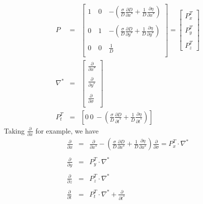 \documentclass[oribibl]{llncs}
\begin{document}
\begin{eqnarray}
P
&=&
\left[             
  \begin{array}{ccc}  
   1\ & 0\  & -\left( \frac{\sigma}{D} \frac{\partial D}{\partial x^*} + \frac{1}{D}\frac{\partial \eta}{\partial x^*} \right)\\   \nonumber \\ 
   0\  & 1\ & -\left(\frac{\sigma}{D} \frac{\partial D}{\partial y^*} + \frac{1}{D}\frac{\partial \eta}{\partial y^*} \right)\\   \nonumber \\ 
   0\ & 0\ & \frac{1}{D} \													      \\   
  \end{array}
\right]
=
\left[                 
  \begin{array}{c}  
    P^T_x  \\   \\ 
    P^T_y  \\  \\ 
    P^T_z  
  \end{array}
\right] 
\\
\nabla^*  &=&
\left[                 
  \begin{array}{c}  
    \frac{\partial}{\partial x^*}  \\  \\ 
    \frac{\partial}{\partial y^*}  \\ \\ 
    \frac{\partial}{\partial \sigma}  \\ 
  \end{array}
\right]\nonumber
\\
P^T_t &=&
\left[
0 \  0 \  -\left( \frac{\sigma}{D} \frac{\partial D}{\partial t^*} + \frac{1}{D}\frac{\partial \eta}{\partial t^*} \right)
\right] \nonumber 
\end{eqnarray}
Taking $\frac{\partial}{\partial x}$ for example, we have
\begin{eqnarray*}
  \frac{\partial}{\partial x}&=& \frac{\partial}{\partial x^*}-(\frac{\sigma}{D}\frac{\partial D}{\partial x^*}+\frac{1}{D}\frac{\partial \eta}{\partial x^*})\frac{\partial}{\partial \sigma}= P^T_x \cdot \nabla^* \\ \\
   \frac{\partial}{\partial y}&=& P^T_y \cdot \nabla ^* \\ \\
   \frac{\partial}{\partial z}&=& P^T_z \cdot \nabla ^*\\ \\
   \frac{\partial}{\partial t}&=& P^T_t \cdot \nabla ^* +   \frac{\partial}{\partial t^*} 
\end{eqnarray*}
\end{document}
